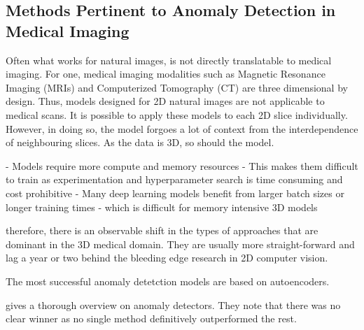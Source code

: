 \subsection{Methods Pertinent to Anomaly Detection in Medical Imaging}

Often what works for natural images, is not directly translatable to medical imaging. For one, medical imaging modalities such as Magnetic Resonance Imaging (MRIs) and Computerized Tomography (CT) are three dimensional by design. Thus, models designed for 2D natural images are not applicable to medical scans. It is possible to apply these models to each 2D slice individually. 
However, in doing so, the model forgoes a lot of context from the interdependence of neighbouring slices. As the data is 3D, so should the model. 



- Models require more compute and memory resources
- This makes them difficult to train as experimentation and hyperparameter search is time consuming and cost prohibitive
- Many deep learning models benefit from larger batch sizes or longer training times
 - which is difficult for memory intensive 3D models

therefore, there is an observable shift in the types of approaches that are dominant in the 3D medical domain. They are usually more straight-forward and lag a year or two behind the bleeding edge research in 2D computer vision.

The most successful anomaly detetction models are based on autoencoders.

 gives a thorough overview on anomaly detectors.
They note that there was no clear winner as no single method definitively outperformed the rest.

